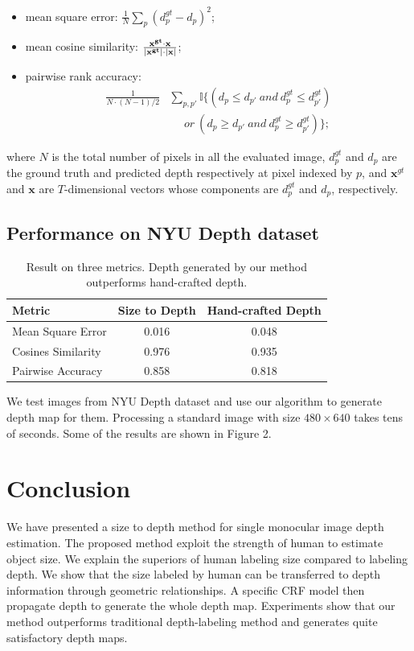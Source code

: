 \documentclass[10pt,twocolumn,letterpaper]{article}
\begin{document}
\begin{itemize}
\item mean square error:
$\frac{1}{N} \sum_p{(d_p^{gt} - d_p)^2} $;
\item mean cosine similarity:
$ \frac{\bf{x}^{gt} \cdot \bf{x}}{|\bf{x}^{gt}| \cdot |\bf{x}|} $;
\item pairwise rank accuracy:\\
\begin{align*}
\frac{1}{N \cdot (N-1) / 2} &\sum_{p, p'}\mathbb{I} \{(d_p \leqslant d_{p'} \ and \ d_p^{gt} \leqslant d_{p'}^{gt}) \\
 &\ \ \ \ \ \  or\  (d_p \geqslant d_{p'} \ and \ d_p^{gt} \geqslant d_{p'}^{gt}) \};
\end{align*} 
\end{itemize}
where $N$ is the total number of pixels in all the evaluated image, $d_p^{gt}$ and $d_p$ are the ground truth and predicted depth respectively at pixel indexed by $p$, and $\mathbf{x}^{gt}$ and $\mathbf{x}$ are $T$-dimensional vectors whose components are $d_p^{gt}$ and $d_p$, respectively.

\subsection{Performance on NYU Depth dataset}

\begin{table}
\begin{center}
\begin{tabular}{|l|c|c|}
\hline
Metric             & Size to Depth & Hand-crafted Depth\\ 
\hline
Mean Square Error  & 0.016     & 0.048 \\
Cosines Similarity     & 0.976    & 0.935 \\
Pairwise Accuracy  & 0.858     & 0.818 \\
\hline
\end{tabular}
\end{center}
\caption{Result on three metrics. Depth generated by our method outperforms hand-crafted depth.}
\end{table}

We test images from NYU Depth dataset \cite{silberman11indoor, Silberman:ECCV12} and use our algorithm to generate depth map for them. Processing a standard image with size $480 \times 640$ takes tens of seconds. Some of the results are shown in Figure 2. 

\section{Conclusion}
We have presented a size to depth method for single monocular image depth estimation. The proposed method exploit the strength of human to estimate object size.  We explain the superiors of human labeling size compared to labeling depth. We show that the size labeled by human can be transferred to depth information through geometric relationships. A specific CRF model then propagate depth to generate the whole depth map. Experiments show that our method outperforms traditional depth-labeling method and generates quite satisfactory depth maps.


{\small


}
\end{document}
